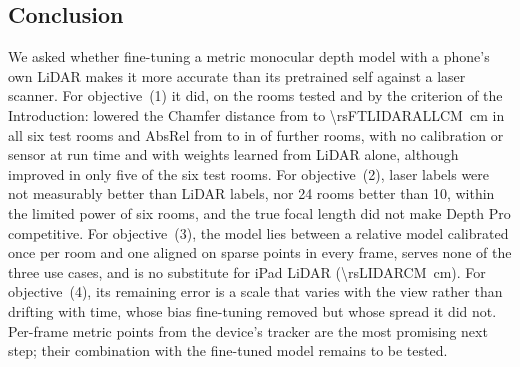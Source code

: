 \subsection{Conclusion}\label{sec:conclusion}
We asked whether fine-tuning a metric monocular depth model with a phone's own LiDAR makes it more accurate than its
pretrained self against a laser scanner. For objective~(1) it did, on the rooms tested and by the criterion of the
Introduction: \ftmain{} lowered the Chamfer distance from \rsMETRICCM{} to \SI{\rsFTLIDARALLCM}{cm} in all six test rooms
and AbsRel from \rsVMETRICABSREL{} to \rsVFTALLABSREL{} in \rsVWINS{} of \rsVN{} further rooms, with no calibration or
sensor at run time and with weights learned from LiDAR alone, although \wone{} improved in only five of the six test
rooms. For objective~(2), laser labels were not measurably better than LiDAR labels, nor 24 rooms better than 10, within
the limited power of six rooms, and the true focal length did not make Depth Pro competitive. For objective~(3), the
model lies between a relative model calibrated once per room and one aligned on sparse points in every frame, serves
none of the three use cases, and is no substitute for iPad LiDAR (\SI{\rsLIDARCM}{cm}). For objective~(4), its remaining
error is a scale that varies with the view rather than drifting with time, whose bias fine-tuning removed but whose
spread it did not. Per-frame metric points from the device's tracker are the most promising next step; their
combination with the fine-tuned model remains to be tested.
